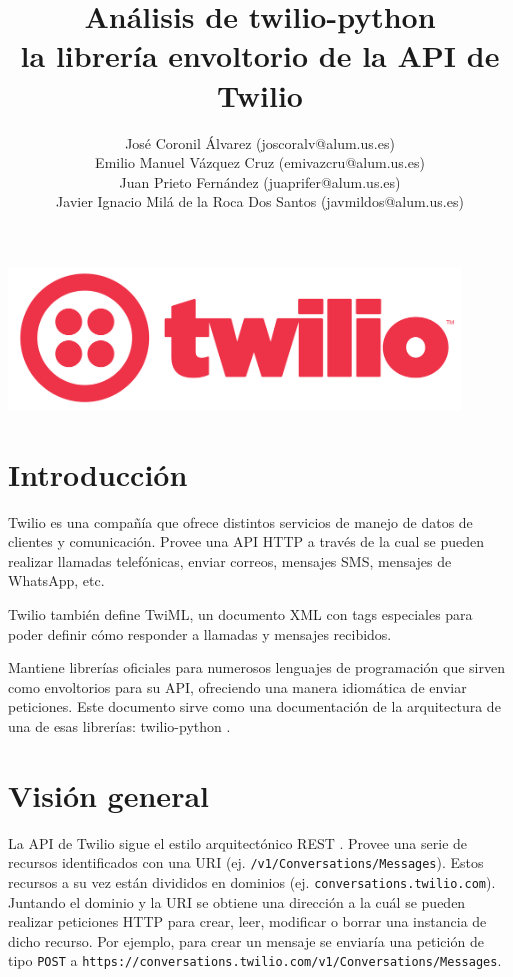 \documentclass{article}
\title{%
  \Huge Análisis de twilio-python\\
  \LARGE la librería envoltorio de la API de Twilio
  }
\author{José Coronil Álvarez (joscoralv@alum.us.es) \\
Emilio Manuel Vázquez Cruz (emivazcru@alum.us.es) \\
Juan Prieto Fernández (juaprifer@alum.us.es) \\
Javier Ignacio Milá de la Roca Dos Santos (javmildos@alum.us.es) \\}
\date{}
\begin{document}
\begin{titlepage}
  \centering
  \hfill
  \vfil
  {\bfseries\Large
      \thetitle
  }    
  \vfill
  \includegraphics[width=12cm]{logo.png} %
  \vfill
  \theauthor
\end{titlepage}

\tableofcontents

\newpage

\section{Introducción}

Twilio es una compañía que ofrece distintos servicios
de manejo de datos de clientes y comunicación.
Provee una API HTTP a través de la cual se pueden realizar llamadas telefónicas,
enviar correos, mensajes SMS, mensajes de WhatsApp, etc.

Twilio también define TwiML,
un documento XML con tags especiales
para poder definir cómo responder a llamadas y mensajes recibidos.

Mantiene librerías oficiales para numerosos lenguajes de programación
que sirven como envoltorios para su API,
ofreciendo una manera idiomática de enviar peticiones.
Este documento sirve como una documentación de la arquitectura
de una de esas librerías: twilio-python \cite{twilio-python}.


\section{Visión general}

La API de Twilio sigue el estilo arquitectónico REST \cite{twilio-rest}.
Provee una serie de recursos identificados con una URI
(ej. \verb|/v1/Conversations/Messages|).
Estos recursos a su vez están divididos en dominios
(ej. \verb|conversations.twilio.com|).
Juntando el dominio y la URI se obtiene una dirección
a la cuál se pueden realizar peticiones HTTP
para crear, leer, modificar o borrar una instancia de dicho recurso.
Por ejemplo, para crear un mensaje se enviaría una petición
de tipo \verb|POST|
a \verb|https://conversations.twilio.com/v1/Conversations/Messages|.
\end{document}
